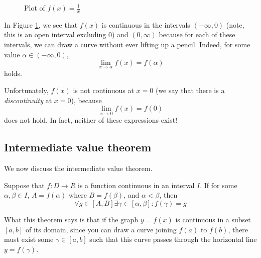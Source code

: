 \begin{figure}[h]
    \centering
    \caption{Plot of $f(x) = \frac{1}{x}$}
    \label{fig:recx}
\end{figure}

In Figure \ref{fig:recx}, we see that $f(x)$ is continuous in the intervals
$(-\infty, 0)$ (note, this is an open interval excluding $0$) and $(0, \infty)$ because for
each of these intervals, we can draw a curve without ever lifting up a pencil. Indeed, for some
value $\alpha \in (-\infty, 0)$,
\[\lim_{x \to \alpha} f(x) = f(\alpha)\]
holds.

Unfortunately, $f(x)$ is not continuous at $x = 0$ (we say that there is a \textit{discontinuity} at $x = 0$),
because \[\lim_{x \to 0} f(x) = f(0)\] does not hold. In fact, neither of these expressions exist!

\subsection{Intermediate value theorem}
We now discuss the intermediate value theorem.
\begin{theorem}
    Suppose that $f : D \to R$ is a function continuous in an interval $I$. If
    for some $\alpha,\beta \in I$,
    $A = f(\alpha)$ where $B = f(\beta)$, and $\alpha < \beta$, then
    \[\forall g \in [A, B] \exists \gamma \in [\alpha, \beta] : f(\gamma) = g\]
\end{theorem}

What this theorem says is that if the graph $y = f(x)$ is continuous in a subset $[a, b]$ of its domain,
since you can draw a curve joining $f(a)$ to $f(b)$, there must exist some $\gamma \in [a, b]$ such that
this curve passes through the horizontal line $y = f(\gamma)$.

